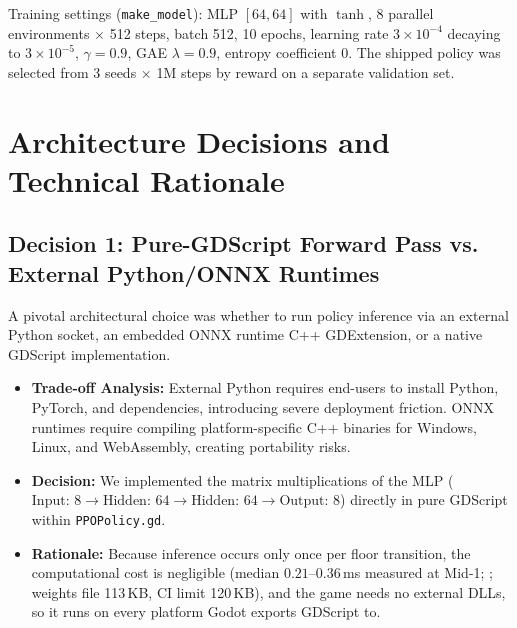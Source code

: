 Training settings (\texttt{make\_model}): MLP $[64, 64]$ with $\tanh$, 8 parallel environments $\times$ 512 steps, batch 512, 10 epochs, learning rate $3\times10^{-4}$ decaying to $3\times10^{-5}$, $\gamma = 0.9$, GAE $\lambda = 0.9$, entropy coefficient 0. The shipped policy was selected from 3 seeds $\times$ 1M steps by reward on a separate validation set.

\section{Architecture Decisions and Technical Rationale}

\subsection{Decision 1: Pure-GDScript Forward Pass vs. External Python/ONNX Runtimes}
A pivotal architectural choice was whether to run policy inference via an external Python socket, an embedded ONNX runtime C++ GDExtension, or a native GDScript implementation.
\begin{itemize}
    \item \textbf{Trade-off Analysis:} External Python requires end-users to install Python, PyTorch, and dependencies, introducing severe deployment friction. ONNX runtimes require compiling platform-specific C++ binaries for Windows, Linux, and WebAssembly, creating portability risks.
    \item \textbf{Decision:} We implemented the matrix multiplications of the MLP ($\text{Input: 8} \rightarrow \text{Hidden: 64} \rightarrow \text{Hidden: 64} \rightarrow \text{Output: 8}$) directly in pure GDScript within \texttt{PPOPolicy.gd}.
    \item \textbf{Rationale:} Because inference occurs only once per floor transition, the computational cost is negligible (median $0.21$--$0.36$\,ms measured at Mid-1; ; weights file 113\,KB, CI limit 120\,KB), and the game needs no external DLLs, so it runs on every platform Godot exports GDScript to.
\end{itemize}

